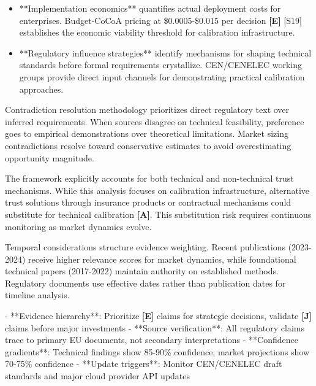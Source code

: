 \documentclass[a4paper,11pt]{article}
\newcommand{\elabel}{\textbf{\textcolor{ecolor}{[E]}}}
\newcommand{\jlabel}{\textbf{\textcolor{jcolor}{[J]}}}
\newcommand{\alabel}{\textbf{\textcolor{acolor}{[A]}}}
\begin{document}
\begin{itemize}
  \item **Implementation economics** quantifies actual deployment costs for enterprises. Budget-CoCoA pricing at \$0.0005-\$0.015 per decision \elabel{} \textcolor{primary}{[S19]} establishes the economic viability threshold for calibration infrastructure.
\end{itemize}

\begin{itemize}
  \item **Regulatory influence strategies** identify mechanisms for shaping technical standards before formal requirements crystallize. CEN/CENELEC working groups provide direct input channels for demonstrating practical calibration approaches.
\end{itemize}

Contradiction resolution methodology prioritizes direct regulatory text over inferred requirements. When sources disagree on technical feasibility, preference goes to empirical demonstrations over theoretical limitations. Market sizing contradictions resolve toward conservative estimates to avoid overestimating opportunity magnitude.


The framework explicitly accounts for both technical and non-technical trust mechanisms. While this analysis focuses on calibration infrastructure, alternative trust solutions through insurance products or contractual mechanisms could substitute for technical calibration \alabel{}. This substitution risk requires continuous monitoring as market dynamics evolve.


Temporal considerations structure evidence weighting. Recent publications (2023-2024) receive higher relevance scores for market dynamics, while foundational technical papers (2017-2022) maintain authority on established methods. Regulatory documents use effective dates rather than publication dates for timeline analysis.


\begin{decisionbox}
- **Evidence hierarchy**: Prioritize \elabel{} claims for strategic decisions, validate \jlabel{} claims before major investments
- **Source verification**: All regulatory claims trace to primary EU documents, not secondary interpretations
- **Confidence gradients**: Technical findings show 85-90\% confidence, market projections show 70-75\% confidence
- **Update triggers**: Monitor CEN/CENELEC draft standards and major cloud provider API updates
\end{decisionbox}
\end{document}
